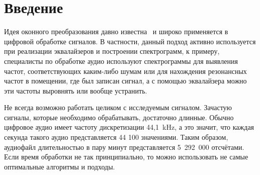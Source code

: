 \documentclass{matmex-diploma-custom}
\begin{document}
\maketitle
\tableofcontents
\newpage
\section*{Введение}
Идея оконного преобразования давно известна~\cite{b-allen} и широко применяется в 
цифровой обработке сигналов. В частности, данный подход активно используется при
реализации эквалайзеров и построении спектрограмм, к примеру, 
специалисты по обработке аудио
используют спектрограммы для выявления частот, соответствующих каким-либо шумам
или для нахождения резонансных частот в помещении, где был записан сигнал, а с 
помощью эквалайзера можно эти частоты выровнять или вообще устранить.

Не всегда возможно работать целиком с исследуемым сигналом. Зачастую сигналы, 
которые необходимо обрабатывать, достаточно длинные. Обычно цифровое аудио имеет
частоту дискретизации 44,1~kHz, а это значит, что каждая секунда такого аудио
представляется 44 100 значениями. Таким образом, аудиофайл длительностью в пару
минут представляется 5~292~000 отсчётами. Если время обработки не так принципиально,
то можно использовать не самые оптимальные алгоритмы и подходы.
\end{document}
